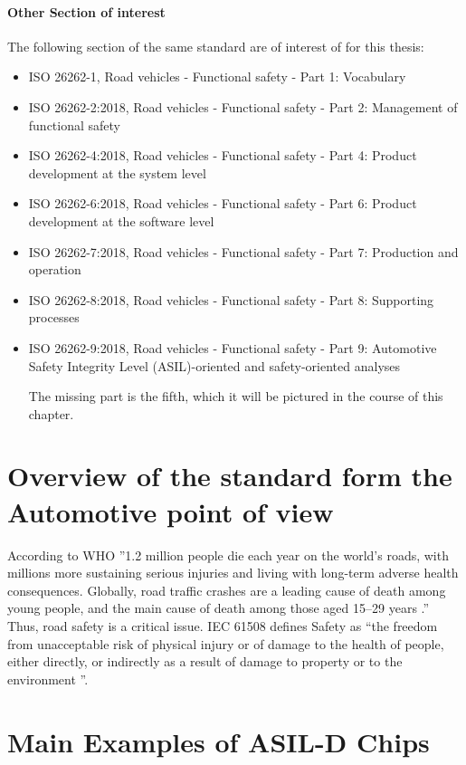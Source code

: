 \documentclass[./dissertation.tex]{subfiles}
\begin{document}
\paragraph{Other Section of interest}
The following section of the same standard are of interest of for this thesis:
\begin{itemize}
\item ISO 26262-1, Road vehicles - Functional safety - Part 1: Vocabulary
\item ISO 26262-2:2018, Road vehicles - Functional safety - Part 2: Management of functional safety
\item ISO 26262-4:2018, Road vehicles - Functional safety - Part 4: Product development at the system level
\item ISO 26262-6:2018, Road vehicles - Functional safety - Part 6: Product development at the software level
\item ISO 26262-7:2018, Road vehicles - Functional safety - Part 7: Production and operation
\item ISO 26262-8:2018, Road vehicles - Functional safety - Part 8: Supporting processes
\item ISO 26262-9:2018, Road vehicles - Functional safety - Part 9: Automotive Safety Integrity Level (ASIL)-oriented and safety-oriented analyses

The missing part is the fifth, which it will be pictured in the course of this chapter.
\end{itemize}



\section{Overview of the standard form the Automotive point of view}

According to WHO ”1.2 million people die each year on the world's roads, with millions more sustaining serious injuries and living with long-term adverse health consequences. Globally, road traffic crashes are a leading cause of death among young people, and the main cause of death among those aged 15–29 years \cite{yeung-2018}.” Thus, road safety is a critical issue. IEC 61508 defines Safety as “the freedom from unacceptable risk of physical injury or of damage to the health of people, either directly, or indirectly as a result of damage to property or to the environment \cite{bell2006introduction}”.


\section{Main Examples of ASIL-D Chips}
\end{document}
